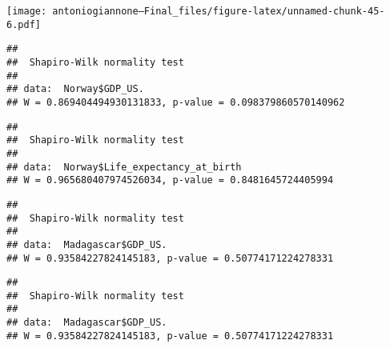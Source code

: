\documentclass[
]{article}
\newenvironment{Shaded}{\begin{snugshade}}{\end{snugshade}}
\newcommand{\FunctionTok}[1]{\textcolor[rgb]{0.13,0.29,0.53}{\textbf{#1}}}
\newcommand{\NormalTok}[1]{#1}
\newcommand{\SpecialCharTok}[1]{\textcolor[rgb]{0.81,0.36,0.00}{\textbf{#1}}}
\begin{document}
\texttt{[image: antoniogiannone---Final\_files/figure-latex/unnamed-chunk-45-6.pdf]}

\begin{Shaded}
\end{Shaded}

\begin{verbatim}
## 
##  Shapiro-Wilk normality test
## 
## data:  Norway$GDP_US.
## W = 0.869404494930131833, p-value = 0.098379860570140962
\end{verbatim}

\begin{Shaded}
\end{Shaded}

\begin{verbatim}
## 
##  Shapiro-Wilk normality test
## 
## data:  Norway$Life_expectancy_at_birth
## W = 0.965680407974526034, p-value = 0.8481645724405994
\end{verbatim}

\begin{Shaded}
\end{Shaded}

\begin{verbatim}
## 
##  Shapiro-Wilk normality test
## 
## data:  Madagascar$GDP_US.
## W = 0.93584227824145183, p-value = 0.50774171224278331
\end{verbatim}

\begin{Shaded}
\end{Shaded}

\begin{verbatim}
## 
##  Shapiro-Wilk normality test
## 
## data:  Madagascar$GDP_US.
## W = 0.93584227824145183, p-value = 0.50774171224278331
\end{verbatim}
\end{document}
